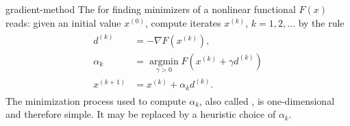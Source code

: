 \begin{Definition}{gradient-method}
  The  for finding minimizers of a nonlinear
  functional $F(x)$ reads:  given an initial value $x^{(0)}$, compute
  iterates $x^{(k)}$, $k=1,2,\ldots$ by the rule
  \begin{gather}
    \label{eq:gradient-method:1}
    \begin{split}
      d^{(k)} &= -\nabla F(x^{(k)}),
      \\
      \alpha_k &=
      \operatorname*{argmin}_{\gamma>0} F\left(x^{(k)} + \gamma d^{(k)}\right)
      \\
      x^{(k+1)} &= x^{(k)} + \alpha_k d^{(k)}.
    \end{split}
  \end{gather}
  The minimization process used to compute $\alpha_k$, also called
  , is one-dimensional
  and therefore simple. It may be replaced by a heuristic choice of
  $\alpha_k$.
\end{Definition}

